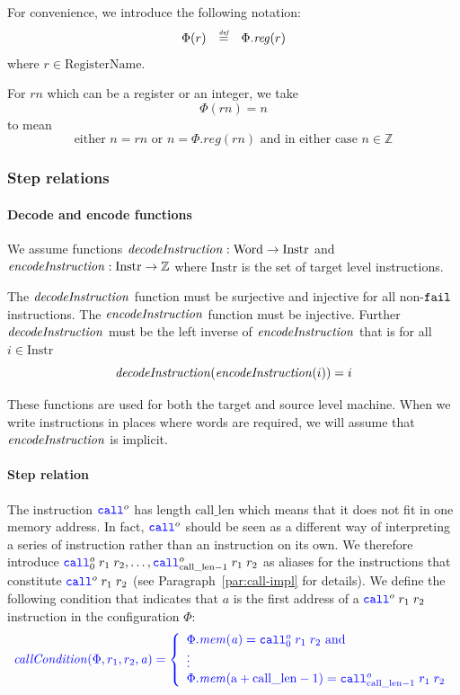 \documentclass[a3paper]{article}
\newcommand{\defeq}{\stackrel{\textit{\tiny{def}}}{=}}
\newcommand{\fun}{\rightarrow}
\newcommand{\tand}{\text{ and }}
\newcommand{\sourcecolor}{\color{blue}}
\newcommand{\src}[1]{{\sourcecolor #1}}
\newcommand{\targetcolor}[1]{\color{black}}
\newcommand{\trg}[1]{{\targetcolor{} #1}}
\newcommand{\zinstr}[1]{\texttt{#1}}
\newcommand{\scall}[4][]{  
\ifthenelse{\equal{#3#4}{}}
  {\ensuremath{\zinstr{\src{call}}_{#1}^{#2}}}
  {\ensuremath{\zinstr{\src{call}}_{#1}^{#2} \; #3 \; #4}}
}
\newcommand{\tfail}{\zinstr{\trg{fail}}}
\newcommand{\ints}{\mathbb{Z}}
\newcommand{\shareddom}[1]{\mathrm{#1}}
\newcommand{\RegName}{\shareddom{RegisterName}}
\newcommand{\Word}{\shareddom{Word}}
\newcommand{\Instr}{\shareddom{Instr}}
\newcommand{\addr}{\shareddom{a}}
\newcommand{\var}[1]{\mathit{#1}}
\newcommand{\rn}{\var{rn}}
\newcommand{\reg}{\var{reg}}
\newcommand{\mem}{\var{mem}}
\newcommand{\aaddr}{\var{a}}
\newcommand{\constant}[1]{\mathrm{#1}}
\newcommand{\calllen}{\constant{call\_len}}
\newcommand{\plainfun}[2]{
  \ifthenelse{\equal{#2}{}}
  {\mathit{#1}}
  {\mathit{#1}(#2)}
}
\newcommand{\callCond}[1]{\plainfun{callCondition}{#1}}
\newcommand{\decInstr}[1]{\plainfun{decodeInstruction}{#1}}
\newcommand{\encInstr}[1]{\plainfun{encodeInstruction}{#1}}
\begin{document}
For convenience, we introduce the following notation:
\[
  \begin{array}{rcl}
    \Phi(r) & \defeq & \Phi.\reg(r)
  \end{array}
\]
where $r\in \RegName$.

For $\rn$ which can be a register or an integer, we take
\[
  \Phi(\rn) = n
\]
to mean
\[
  \text{either $n = \rn$ or $n = \Phi.\reg(\rn)$ and in either case $n \in \ints$}
\]


\subsubsection{Step relations}
\paragraph{Decode and encode functions}
We assume functions $\decInstr{} : \Word \fun \Instr$ and $\encInstr{} : \Instr \fun \ints$ where $\Instr$ is the set of target level instructions.

The $\decInstr{}$ function must be surjective and injective for all non-$\tfail$ instructions. The $\encInstr{}$ function must be injective. Further $\decInstr{}$ must be the left inverse of $\encInstr{}$ that is for all $i \in \Instr$
\[
  \decInstr{}(\encInstr{i}) = i
\]

These functions are used for both the target and source level machine. When we write instructions in places where words are required, we will assume that $\encInstr{}$ is implicit.

\paragraph{Step relation}
The instruction $\scall{o}{}{}$ has length $\calllen$ which means that it does not fit in one memory address. In fact, $\scall{o}{}{}$ should be seen as a different way of interpreting a series of instruction rather than an instruction on its own. We therefore introduce $\scall[0]{o}{r_1}{r_2},\dots,\scall[\calllen-1]{o}{r_1}{r_2}$ as aliases for the instructions that constitute $\scall{o}{r_1}{r_2}$ (see Paragraph~\ref{par:call-impl} for details). We define the following condition that indicates that $\aaddr$ is the first address of a $\scall{o}{r_1}{r_2}$ instruction in the configuration $\Phi$:
\[
  \sourcecolor\left.
    \callCond{\Phi,r_1,r_2,\aaddr} = \left\{
      \begin{array}{l}
        \Phi.\mem(\aaddr) = \scall[0]{o}{r_1}{r_2} \tand\\
        \vdots \\
        \Phi.\mem(\addr+\calllen-1) = \scall[\calllen-1]{o}{r_1}{r_2}
      \end{array}
      \right.
  \right.
\]
\end{document}
